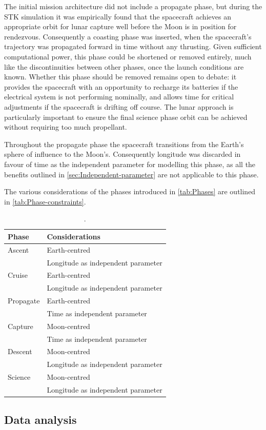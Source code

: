 The initial mission architecture did not include a propagate phase, but during the STK simulation it was empirically found that the spacecraft achieves an appropriate orbit for lunar capture well before the Moon is in position for rendezvous. Consequently a coasting phase was inserted, when the spacecraft's trajectory was propagated forward in time without any thrusting. Given sufficient computational power, this phase could be shortened or removed entirely, much like the discontinuities between other phases, once the launch conditions are known. Whether this phase should be removed remains open to debate: it provides the spacecraft with an opportunity to recharge its batteries if the electrical system is not performing nominally, and allows time for critical adjustments if the spacecraft is drifting off course. The lunar approach is particularly important to ensure the final science phase orbit can be achieved without requiring too much propellant.

Throughout the propagate phase the spacecraft transitions from the Earth's sphere of influence to the Moon's. Consequently longitude was discarded in favour of time as the independent parameter for modelling this phase, as all the benefits outlined in \autoref{sec:Independent-parameter} are not applicable to this phase.

The various considerations of the phases introduced in \autoref{tab:Phases} are outlined in \autoref{tab:Phase-constraints}.

\begin{table}
\caption{.} \label{tab:Phase-constraints}
\begin{tabular}{l p{}} \toprule
Phase & Considerations \tabularnewline\midrule
Ascent & Earth-centred \tabularnewline
& Longitude as independent parameter \tabularnewline
Cruise & Earth-centred \tabularnewline
& Longitude as independent parameter \tabularnewline
Propagate & Earth-centred \tabularnewline
& Time as independent parameter \tabularnewline
Capture & Moon-centred \tabularnewline
& Time as independent parameter \tabularnewline
Descent & Moon-centred \tabularnewline
& Longitude as independent parameter \tabularnewline
Science & Moon-centred \tabularnewline
& Longitude as independent parameter \tabularnewline
\bottomrule
\end{tabular}
\end{table}

\subsection{Data analysis} \label{sub:Data-analysis}

